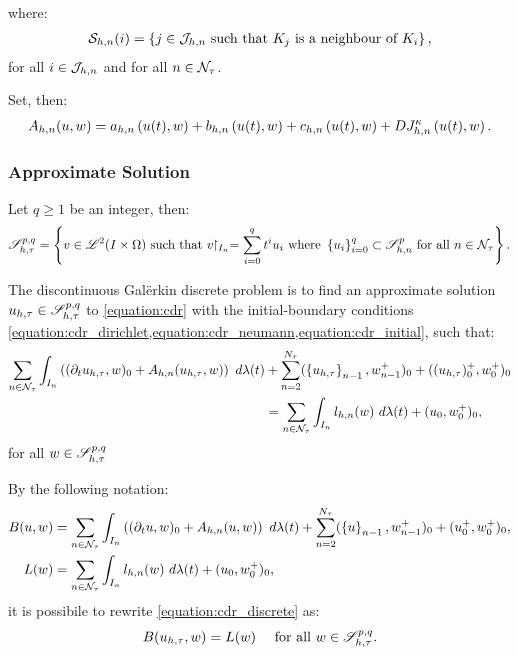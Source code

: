 where:
\begin{align}
    \mathcal{S}_{h, n}(i) = \left\{ j \in \mathcal{J}_{h, n} \text{ such that } K_j \text{ is a neighbour of } K_i \right\},
\end{align}
for all $i \in \mathcal{J}_{h, n}$ and for all $n \in \mathcal{N}_{\tau}$.

Set, then:
\begin{align}
    A_{h, n}(u, w) = a_{h, n} \left( u(t), w \right) + b_{h, n} \left( u(t), w \right) + c_{h, n} \left( u(t), w \right) + D J^{\kappa}_{h, n} \left( u(t), w \right) \label{equation:cdr_Ahn}.
\end{align}

\newpage
\subsubsection{Approximate Solution}

\begin{definition}[$\SpaceSolutionFull$]
    Let $q \geq 1$ be an integer, then:
    \begin{align} %
        \SpaceSolutionFull = \left\{ v \in \SpaceLp{2}(I \times \Omega) \text{ such that } v \Restriction_{I_n} = \sum_{i = 0}^q t^i u_i \text{ where } \left\{ u_i \right\}_{i = 0}^q \subset \SpaceSolution_{h, n}^p \text{ for all } n \in \TimeIndices \right\}.
    \end{align}
\end{definition}

The discontinuous Galërkin discrete problem is to find an approximate solution $u_{h, \tau} \in \mathscr{S}^{p, q}_{h, \tau}$ to \cref{equation:cdr} with the initial-boundary conditions \cref{equation:cdr_dirichlet,equation:cdr_neumann,equation:cdr_initial}, such that:
\begin{align} %
    \sum_{n \in \TimeIndices} \int_{I_n} \left( (\partial_t u_{h, \tau}, w )_0 + A_{h, n}(u_{h, \tau}, w) \right) ~ d \lambda(t) \notag &+ \sum_{n = 2}^{\nTimeIndices} (\left\{ u_{h, \tau} \right\}_{n - 1}, w_{n - 1}^+ )_0 + ((u_{h, \tau})_0^+, w_0^+ )_0 \notag \\
    &= \sum_{n \in \TimeIndices} \int_{I_n} l_{h, n}(w) ~ d \lambda(t) + (u_0, w_0^+ )_0, \label{equation:cdr_discrete}
\end{align}
for all $w \in \mathscr{S}^{p, q}_{h, \tau}$

By the following notation:
\begin{align}
    B(u, w) &= \sum_{n \in \mathcal{N}_{\tau}} \int_{I_n} \left( (\partial_t u, w )_0 + A_{h, n}(u, w) \right) ~ d \lambda(t) + \sum_{n = 2}^{N_{\tau}} (\left\{ u \right\}_{n - 1}, w_{n - 1}^+ )_0 + (u_0^+, w_0^+ )_0, \label{equation:cdr_B} \\
    L(w) &= \sum_{n \in \mathcal{N}_{\tau}} \int_{I_n} l_{h, n}(w) ~ d \lambda(t) + (u_0, w_0^+ )_0 \label{equation:cdr_L},
\end{align}
it is possibile to rewrite \cref{equation:cdr_discrete} as:
\begin{align}
    B(u_{h, \tau}, w) &= L(w) &\text{ for all } w \in \mathscr{S}^{p, q}_{h, \tau}. \label{equation:cdr_discrete_short}
\end{align}

